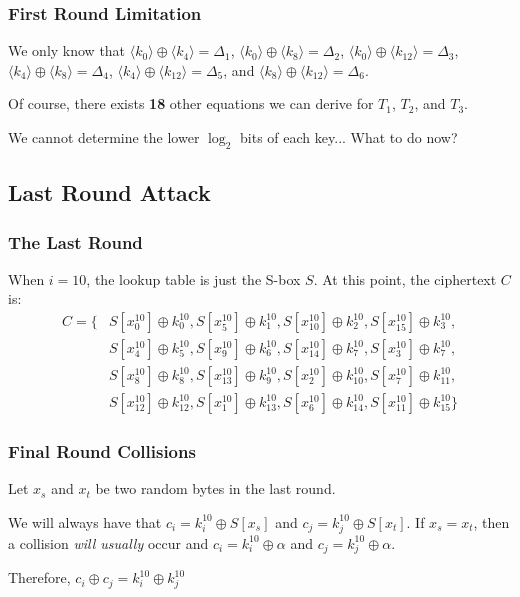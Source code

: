 \documentclass[8pt,handout]{beamer}
\begin{document}
\begin{frame}
	\frametitle{First Round Limitation}
We only know that $\langle k_0 \rangle \oplus \langle k_4 \rangle = \Delta_1$, $\langle k_0 \rangle \oplus \langle k_8 \rangle = \Delta_2$,
$\langle k_0 \rangle \oplus \langle k_{12} \rangle = \Delta_3$, $\langle k_4 \rangle \oplus \langle k_8 \rangle = \Delta_4$, 
$\langle k_4 \rangle \oplus \langle k_{12} \rangle = \Delta_5$, and $\langle k_8 \rangle \oplus \langle k_{12} \rangle = \Delta_6$.

\bigskip

Of course, there exists \textbf{18} other equations we can derive for $T_1$, $T_2$, and $T_3$.

\bigskip

We cannot determine the lower $\log_2$ bits of each key... What to do now?

\end{frame}

\subsection{Last Round Attack}
\begin{frame}
	\frametitle{The Last Round}
	When $i = 10$, the lookup table is just the S-box $S$. At this point, the ciphertext $C$ is:
\begin{align*}
C = \{ & S[x_0^{10}] \oplus k_0^{10}, S[x_5^{10}] \oplus k_1^{10}, S[x_{10}^{10}] \oplus k_2^{10}, S[x_{15}^{10}] \oplus k_3^{10}, \\
& S[x_4^{10}] \oplus k_5^{10}, S[x_9^{10}] \oplus k_6^{10}, S[x_{14}^{10}] \oplus k_7^{10}, S[x_3^{10}] \oplus k_7^{10}, \\
& S[x_8^{10}] \oplus k_8^{10}, S[x_{13}^{10}] \oplus k_9^{10}, S[x_2^{10}] \oplus k_{10}^{10}, S[x_7^{10}] \oplus k_{11}^{10}, \\
& S[x_{12}^{10}] \oplus k_{12}^{10}, S[x_{1}^{10}] \oplus k_{13}^{10}, S[x_6^{10}] \oplus k_{14}^{10}, S[x_{11}^{10}] \oplus k_{15}^{10}\} 
\end{align*}
\end{frame}

\begin{frame}
	\frametitle{Final Round Collisions}
	Let $x_s$ and $x_t$ be two random bytes in the last round. 
	
	\bigskip
	
	We will always have that $c_i = k_i^{10} \oplus S[x_s]$ and $c_j = k_j^{10} \oplus S[x_t]$. If $x_s = x_t$, then a collision \emph{will usually} occur
	and $c_i = k_i^{10} \oplus \alpha$ and $c_j = k_j^{10} \oplus \alpha$.
	
	\bigskip

	Therefore, $c_i \oplus c_j = k_i^{10} \oplus k_j^{10}$
	
\end{frame}
\end{document}
